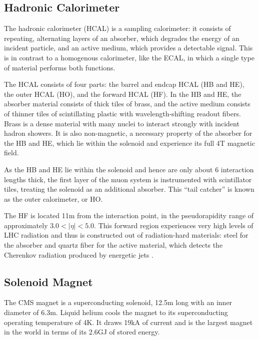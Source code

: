 \subsection{Hadronic Calorimeter}
The hadronic calorimeter (HCAL) is a sampling calorimeter: it consists of repeating, alternating layers of an absorber, which degrades the energy of an incident particle, and an active medium, which provides a detectable signal.
This is in contrast to a homogenous calorimeter, like the ECAL, in which a single type of material performs both functions.

The HCAL consists of four parts: the barrel and endcap HCAL (HB and HE), the outer HCAL (HO), and the forward HCAL (HF).
In the HB and HE, the absorber material consists of thick tiles of brass, and the active medium consists of thinner tiles of scintillating plastic with wavelength-shifting readout fibers.
Brass is a dense material with many nuclei to interact strongly with incident hadron showers.
It is also non-magnetic, a necessary property of the absorber for the HB and HE, which lie within the solenoid and experience its full 4\unit{T} magnetic field.

As the HB and HE lie within the solenoid and hence are only about 6 interaction lengths thick, the first layer of the muon system is instrumented with scintillator tiles, treating the solenoid as an additional absorber.
This ``tail catcher'' is known as the outer calorimeter, or HO.

The HF is located 11\unit{m} from the interaction point, in the pseudorapidity range of approximately $3.0 < |\eta| < 5.0$.
This forward region experiences very high levels of LHC radiation and thus is constructed out of radiation-hard materials: steel for the absorber and quartz fiber for the active material, which detects the Cherenkov radiation produced by energetic jets \cite{Chatrchyan:2008zzk, CERN-LHCC-97-031, Penzo2009}.

\subsection{Solenoid Magnet}
The CMS magnet is a superconducting solenoid, 12.5\unit{m} long with an inner diameter of 6.3\unit{m}. Liquid helium cools the magnet to its superconducting operating temperature of 4\unit{K}. It draws 19\unit{kA} of current and is the largest magnet in the world in terms of its 2.6\unit{GJ} of stored energy.


